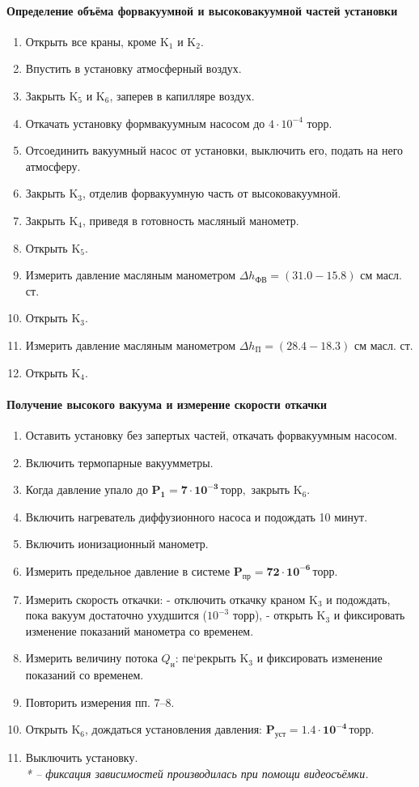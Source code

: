 \documentclass{letnab}
\begin{document}
\paragraph{Определение объёма форвакуумной и высоковакуумной частей установки}
\begin{enumerate}
	\item Открыть все краны, кроме K$_1$ и K$_2$.
\item Впустить в установку атмосферный воздух.
\item Закрыть K$_5$ и K$_6$, заперев в капилляре воздух.
\item Откачать установку формвакуумным насосом до $4 \cdot 10^{-4}$ торр.
\item Отсоединить вакуумный насос от установки, выключить его, подать на него атмосферу.
\item Закрыть K$_3$, отделив форвакуумную часть от высоковакуумной.
\item Закрыть K$_4$, приведя в готовность масляный манометр.
\item Открыть K$_5$.
\item Измерить давление масляным манометром $\Delta h_\text{ФВ} = (31.0 - 15.8)$ см масл. ст.  
\item Открыть K$_3$.
\item Измерить давление масляным манометром $\Delta h_\text{П} = (28.4 - 18.3)$ см масл. ст.
\item Открыть K$_4$.
\end{enumerate}
\paragraph{Получение высокого вакуума и измерение скорости откачки}
\begin{enumerate}
	\item Оставить установку без запертых частей, откачать форвакуумным насосом.
	\item Включить термопарные вакуумметры.
	\item Когда давление упало до $\mathbf{P_1 = 7 \cdot 10^{-3}\,\text{торр},}$ закрыть K$_6$.
	\item Включить нагреватель диффузионного насоса и подождать 10 минут.
	\item Включить ионизационный манометр.
	\item Измерить предельное давление в системе $\mathbf{P_\text{пр} = 72 \cdot 10^{-6}\,\text{торр}.}$
	\item Измерить скорость откачки:
	- отключить откачку краном K$_3$ и подождать, пока вакуум достаточно ухудшится ($10^{-3}$ торр),
	- открыть K$_3$ и фиксировать изменение показаний манометра со временем\*.
	\item Измерить величину потока $Q_\text{н}$: пе`рекрыть K$_3$ и фиксировать изменение показаний со временем.
	\item Повторить измерения пп. 7–8.
	\item Открыть K$_6$, дождаться установления давления: $\mathbf{P_\text{уст} = 1.4 \cdot 10^{-4}\,\text{торр}.}$
	\item Выключить установку.	\\
\textit{	* – фиксация зависимостей производилась при помощи видеосъёмки.}
\end{enumerate}
\end{document}

